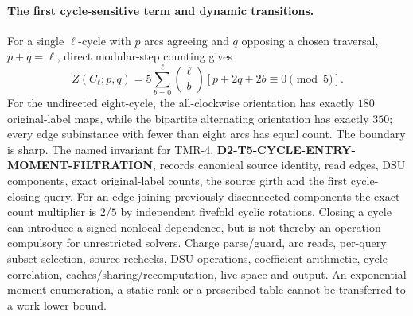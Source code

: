 \documentclass[11pt]{article}
\begin{document}
\paragraph{The first cycle-sensitive term and dynamic transitions.}
For a single $\ell$-cycle with $p$ arcs agreeing and $q$ opposing
a chosen traversal, $p+q=\ell$, direct modular-step counting gives
\[
Z(C_\ell;p,q)
=5\sum_{b=0}^{\ell}\binom{\ell}{b}
[p+2q+2b\equiv0\pmod5].
\]
For the undirected eight-cycle, the all-clockwise orientation has
exactly $180$ original-label maps, while the bipartite alternating
orientation has exactly $350$; every edge subinstance with fewer
than eight arcs has equal count. The boundary is sharp.
The named invariant for TMR-4,
\textbf{D2-T5-CYCLE-ENTRY-MOMENT-FILTRATION}, records canonical
source identity, read edges, DSU components, exact original-label
counts, the source girth and the first cycle-closing query.
For an edge joining previously disconnected components the exact
count multiplier is $2/5$ by independent fivefold cyclic rotations.
Closing a cycle can introduce a signed nonlocal dependence, but
is not thereby an operation compulsory for unrestricted solvers.
Charge parse/guard, arc reads, per-query subset selection,
source rechecks, DSU operations, coefficient arithmetic, cycle
correlation, caches/sharing/recomputation, live space and output.
An exponential moment enumeration, a static rank or a prescribed
table cannot be transferred to a work lower bound.
\end{document}
